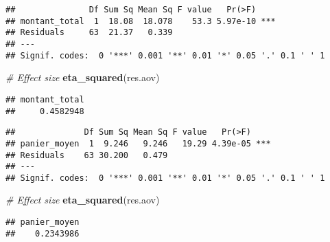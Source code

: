 \documentclass[
]{article}
\newenvironment{Shaded}{\begin{snugshade}}{\end{snugshade}}
\newcommand{\CommentTok}[1]{\textcolor[rgb]{0.56,0.35,0.01}{\textit{#1}}}
\newcommand{\DataTypeTok}[1]{\textcolor[rgb]{0.13,0.29,0.53}{#1}}
\newcommand{\KeywordTok}[1]{\textcolor[rgb]{0.13,0.29,0.53}{\textbf{#1}}}
\newcommand{\NormalTok}[1]{#1}
\newcommand{\OperatorTok}[1]{\textcolor[rgb]{0.81,0.36,0.00}{\textbf{#1}}}
\newcommand{\StringTok}[1]{\textcolor[rgb]{0.31,0.60,0.02}{#1}}
\begin{document}
\begin{verbatim}
##               Df Sum Sq Mean Sq F value   Pr(>F)    
## montant_total  1  18.08  18.078    53.3 5.97e-10 ***
## Residuals     63  21.37   0.339                     
## ---
## Signif. codes:  0 '***' 0.001 '**' 0.01 '*' 0.05 '.' 0.1 ' ' 1
\end{verbatim}

\begin{Shaded}
\begin{Highlighting}[]
\CommentTok{# Effect size}
\KeywordTok{eta_squared}\NormalTok{(res.aov)}
\end{Highlighting}
\end{Shaded}

\begin{verbatim}
## montant_total 
##     0.4582948
\end{verbatim}

\begin{Shaded}
\end{Shaded}

\begin{verbatim}
##              Df Sum Sq Mean Sq F value   Pr(>F)    
## panier_moyen  1  9.246   9.246   19.29 4.39e-05 ***
## Residuals    63 30.200   0.479                     
## ---
## Signif. codes:  0 '***' 0.001 '**' 0.01 '*' 0.05 '.' 0.1 ' ' 1
\end{verbatim}

\begin{Shaded}
\begin{Highlighting}[]
\CommentTok{# Effect size}
\KeywordTok{eta_squared}\NormalTok{(res.aov)}
\end{Highlighting}
\end{Shaded}

\begin{verbatim}
## panier_moyen 
##    0.2343986
\end{verbatim}

\begin{Shaded}
\end{Shaded}
\end{document}
